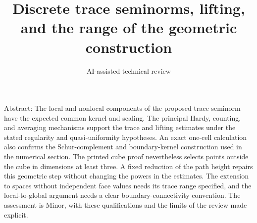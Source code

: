 \documentclass[10pt]{article}
\title{Discrete trace seminorms, lifting, and the range of the geometric construction}
\author{AI-assisted technical review}
\date{}
\begin{document}
\maketitle
Abstract: The local and nonlocal components of the proposed trace seminorm have the expected common kernel and scaling. The principal Hardy, counting, and averaging mechanisms support the trace and lifting estimates under the stated regularity and quasi-uniformity hypotheses. An exact one-cell calculation also confirms the Schur-complement and boundary-kernel construction used in the numerical section. The printed cube proof nevertheless selects points outside the cube in dimensions at least three. A fixed reduction of the path height repairs this geometric step without changing the powers in the estimates. The extension to spaces without independent face values needs its trace range specified, and the local-to-global argument needs a clear boundary-connectivity convention. The assessment is Minor, with these qualifications and the limits of the review made explicit.\par
\end{document}
